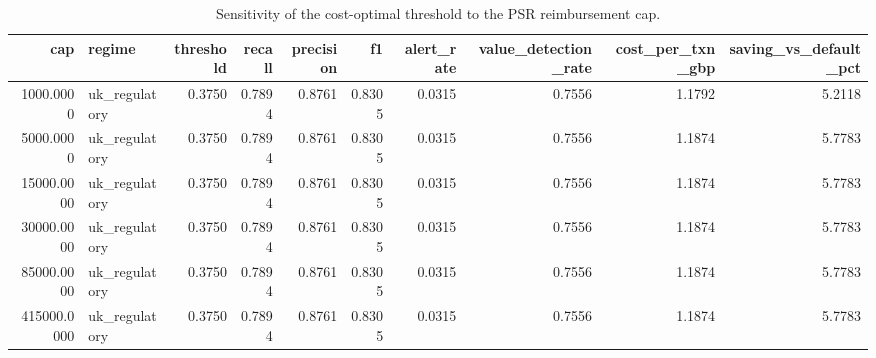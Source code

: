 \begin{table}
\caption{Sensitivity of the cost-optimal threshold to the PSR reimbursement cap.}
\label{tab:table5_sensitivity_cap}
\begin{tabular}{rlrrrrrrrr}
\toprule
cap & regime & threshold & recall & precision & f1 & alert\_rate & value\_detection\_rate & cost\_per\_txn\_gbp & saving\_vs\_default\_pct \\
\midrule
1000.0000 & uk\_regulatory & 0.3750 & 0.7894 & 0.8761 & 0.8305 & 0.0315 & 0.7556 & 1.1792 & 5.2118 \\
5000.0000 & uk\_regulatory & 0.3750 & 0.7894 & 0.8761 & 0.8305 & 0.0315 & 0.7556 & 1.1874 & 5.7783 \\
15000.0000 & uk\_regulatory & 0.3750 & 0.7894 & 0.8761 & 0.8305 & 0.0315 & 0.7556 & 1.1874 & 5.7783 \\
30000.0000 & uk\_regulatory & 0.3750 & 0.7894 & 0.8761 & 0.8305 & 0.0315 & 0.7556 & 1.1874 & 5.7783 \\
85000.0000 & uk\_regulatory & 0.3750 & 0.7894 & 0.8761 & 0.8305 & 0.0315 & 0.7556 & 1.1874 & 5.7783 \\
415000.0000 & uk\_regulatory & 0.3750 & 0.7894 & 0.8761 & 0.8305 & 0.0315 & 0.7556 & 1.1874 & 5.7783 \\
\bottomrule
\end{tabular}
\end{table}
